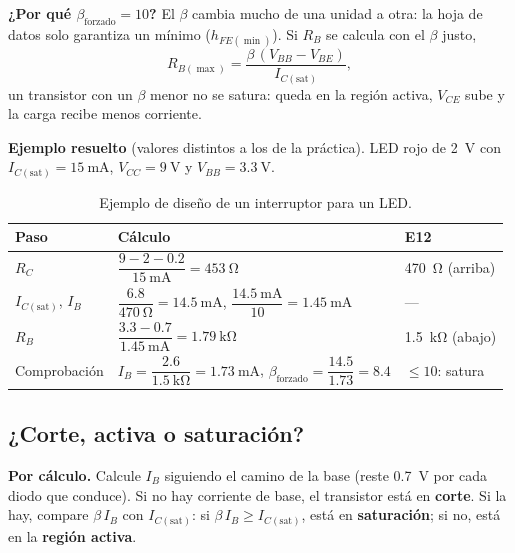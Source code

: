 \documentclass[11pt,a4paper]{article}
\let\needspace\Needspace
\begin{document}
\noindent\textbf{¿Por qué $\beta_{\text{forzado}} = 10$?} El $\beta$ cambia mucho de una
unidad a otra: la hoja de datos solo garantiza un mínimo ($h_{FE(\min)}$). Si $R_B$ se
calcula con el $\beta$ justo,
\begin{equation}
  R_{B(\max)} = \frac{\beta\,(V_{BB} - V_{BE})}{I_{C(\text{sat})}},
  \label{eq:rbmax}
\end{equation}
un transistor con un $\beta$ menor no se satura: queda en la región activa, $V_{CE}$ sube y
la carga recibe menos corriente.

\needspace{14\baselineskip}
\noindent\textbf{Ejemplo resuelto} (valores distintos a los de la práctica). LED rojo de
\qty{2}{\volt} con $I_{C(\text{sat})} = \qty{15}{\milli\ampere}$, $V_{CC} = \qty{9}{\volt}$ y
$V_{BB} = \qty{3.3}{\volt}$.
\begin{table}[H]
  \centering
  \renewcommand{\arraystretch}{2.1}
  \begin{tabularx}{\linewidth}{|>{\centering\arraybackslash}m{2.6cm}|>{\centering\arraybackslash}X|>{\centering\arraybackslash}m{2.8cm}|}
    \hline
    \textbf{Paso} & \textbf{Cálculo} & \textbf{E12} \\ \hline
    $R_C$ & $\dfrac{9 - 2 - \num{0.2}}{\qty{15}{\milli\ampere}} = \qty{453}{\ohm}$
          & \qty{470}{\ohm} (arriba) \\ \hline
    $I_{C(\text{sat})}$, $I_B$ & $\dfrac{\num{6.8}}{\qty{470}{\ohm}} = \qty{14.5}{\milli\ampere}$,
            \qquad $\dfrac{\qty{14.5}{\milli\ampere}}{10} = \qty{1.45}{\milli\ampere}$ & --- \\ \hline
    $R_B$ & $\dfrac{\num{3.3} - \num{0.7}}{\qty{1.45}{\milli\ampere}} = \qty{1.79}{\kilo\ohm}$
          & \qty{1.5}{\kilo\ohm} (abajo) \\ \hline
    Comprobación & $I_B = \dfrac{\num{2.6}}{\qty{1.5}{\kilo\ohm}} = \qty{1.73}{\milli\ampere}$,
                   \qquad $\beta_{\text{forzado}} = \dfrac{\num{14.5}}{\num{1.73}} = \num{8.4}$
                 & $\leq 10$: satura \\ \hline
  \end{tabularx}
  \caption{Ejemplo de diseño de un interruptor para un LED.}
  \label{tab:ejemplo}
\end{table}

\subsection{¿Corte, activa o saturación?}
\label{sec:identificar}
\noindent\textbf{Por cálculo.} Calcule $I_B$ siguiendo el camino de la base (reste
\qty{0.7}{\volt} por cada diodo que conduce). Si no hay corriente de base, el transistor está
en \textbf{corte}. Si la hay, compare $\beta\,I_B$ con $I_{C(\text{sat})}$: si
$\beta\,I_B \geq I_{C(\text{sat})}$, está en \textbf{saturación}; si no, está en la
\textbf{región activa}.
\end{document}
